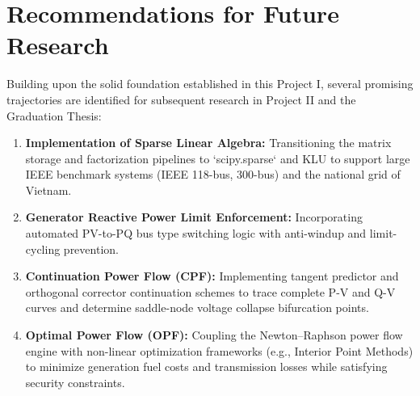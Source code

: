 \documentclass[12pt,a4paper,oneside]{report}
\begin{document}
\section{Recommendations for Future Research}
Building upon the solid foundation established in this Project I, several promising trajectories are identified for subsequent research in Project II and the Graduation Thesis:
\begin{enumerate}
    \item \textbf{Implementation of Sparse Linear Algebra:} Transitioning the matrix storage and factorization pipelines to `scipy.sparse` and KLU to support large IEEE benchmark systems (IEEE 118-bus, 300-bus) and the national grid of Vietnam.
    \item \textbf{Generator Reactive Power Limit Enforcement:} Incorporating automated PV-to-PQ bus type switching logic with anti-windup and limit-cycling prevention.
    \item \textbf{Continuation Power Flow (CPF):} Implementing tangent predictor and orthogonal corrector continuation schemes to trace complete P-V and Q-V curves and determine saddle-node voltage collapse bifurcation points.
    \item \textbf{Optimal Power Flow (OPF):} Coupling the Newton--Raphson power flow engine with non-linear optimization frameworks (e.g., Interior Point Methods) to minimize generation fuel costs and transmission losses while satisfying security constraints.
\end{enumerate}
\end{document}
